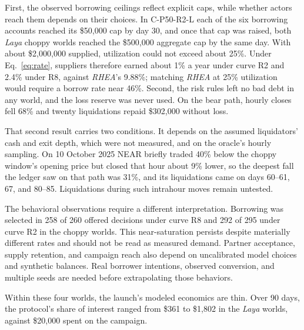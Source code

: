 First, the observed borrowing ceilings reflect explicit caps, while whether
actors reach them depends on their choices. In C-P50-R2-L each of the six borrowing
accounts reached its \$50{,}000 cap by day 30, and once that cap was raised,
both \textit{Laya} choppy worlds reached the \$500{,}000 aggregate cap by the
same day. With about \$2{,}000{,}000 supplied, utilization could not exceed
about 25\%. Under Eq.~\eqref{eq:rate}, suppliers therefore earned about 1\% a
year under curve R2 and 2.4\% under R8, against \textit{RHEA}'s 9.88\%;
matching \textit{RHEA} at 25\% utilization would require a borrow rate near
46\%. Second, the risk rules left no bad debt in any world, and the loss
reserve was never used. On the bear path, hourly closes fell 68\% and twenty
liquidations repaid \$302{,}000 without loss.

That second result carries two conditions. It depends on the assumed
liquidators' cash and exit depth, which were not measured, and on the
oracle's hourly sampling. On 10 October 2025 NEAR briefly traded 40\% below
the choppy window's opening price but closed that hour about 9\% lower, so the
deepest fall the ledger saw on that path was 31\%, and its liquidations came
on days 60--61, 67, and 80--85. Liquidations during such intrahour moves remain
untested.

The behavioral observations require a different interpretation.
Borrowing was selected in 258 of 260 offered decisions under curve R8 and
292 of 295 under curve R2 in the choppy worlds. This near-saturation persists
despite materially different rates and should not be read as measured demand.
Partner acceptance, supply retention, and campaign reach also depend on
uncalibrated model choices and synthetic balances. Real borrower intentions,
observed conversion, and multiple seeds are needed before extrapolating those
behaviors.

Within these four worlds, the launch's modeled economics are thin. Over 90 days, the
protocol's share of interest ranged from \$361 to \$1{,}802 in the
\textit{Laya} worlds, against \$20{,}000 spent on the campaign.
